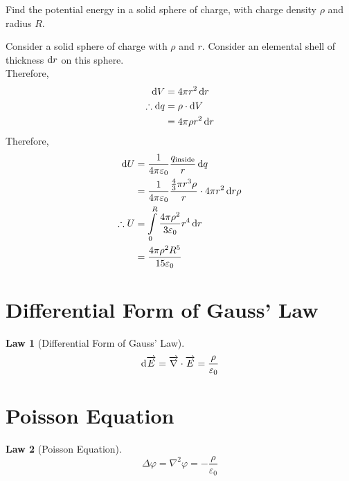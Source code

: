\documentclass[fleqn, a4paper, 8pt, twoside]{amsart}
\theoremstyle{definition}
\theoremstyle{theorem}
\newtheorem{law}{Law}
\begin{document}
\begin{multicols}{2}
\begin{spacing}{0.6}
\begin{question}
	Find the potential energy in a solid sphere of charge, with charge density $\rho$ and radius $R$.
\end{question}

\begin{solution}
	Consider a solid sphere of charge with $\rho$ and $r$.
	Consider an elemental shell of thickness $\dif r$ on this sphere.\\
	Therefore,
	\begin{align*}
		\dif V &= 4 \pi r^2 \dif r\\
		\therefore \dif q &= \rho \cdot \dif V\\
		&= 4 \pi \rho r^2 \dif r
	\end{align*}
	Therefore,
	\begin{align*}
		\dif U &= \frac{1}{4 \pi \varepsilon_0} \frac{q_{\textnormal{inside}}}{r} \dif q\\
		&= \frac{1}{4 \pi \varepsilon_0} \frac{\frac{4}{3} \pi r^3 \rho}{r} \cdot 4 \pi r^2 \dif r \rho\\
		\therefore U &= \int\limits_{0}^{R} \frac{4 \pi \rho^2}{3 \varepsilon_0} r^4 \dif r\\
		&= \frac{4 \pi \rho^2 R^5}{15 \varepsilon_0}
	\end{align*}
\end{solution}

\section{Differential Form of Gauss' Law}

\begin{law}[Differential Form of Gauss' Law]
	\begin{equation*}
		\dif \overrightarrow{E} = \overrightarrow{\nabla} \cdot \overrightarrow{E} = \frac{\rho}{\varepsilon_0}
	\end{equation*}
	\label{Differential_Form_of_Gauss'_Law}
\end{law}

\section{Poisson Equation}

\begin{law}[Poisson Equation]
	\begin{equation*}
		\Delta \varphi = \nabla^2 \varphi = -\frac{\rho}{\varepsilon_0}
	\end{equation*}
\end{law}


\end{spacing}
\end{multicols}
\end{document}
